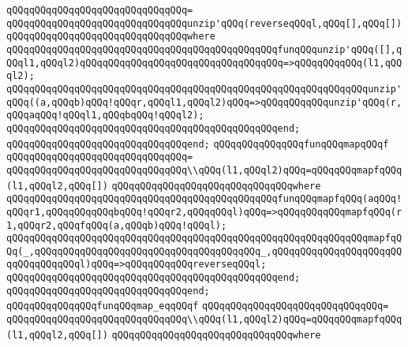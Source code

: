 \verb|qQQqqQQqqQQqqQQqqQQqqQQqqQQqqQQq=|\newline
\verb|qQQqqQQqqQQqqQQqqQQqqQQqqQQqqQQqunzip'qQQq(reverseqQQql,qQQq[],qQQq[])|\newline
\verb|qQQqqQQqqQQqqQQqqQQqqQQqqQQqqQQqwhere|\newline
\verb|qQQqqQQqqQQqqQQqqQQqqQQqqQQqqQQqqQQqqQQqqQQqqQQqfunqQQqunzip'qQQq([],qQQql1,qQQql2)qQQqqQQqqQQqqQQqqQQqqQQqqQQqqQQqqQQq=>qQQqqQQqqQQq(l1,qQQql2);|\newline
\verb|qQQqqQQqqQQqqQQqqQQqqQQqqQQqqQQqqQQqqQQqqQQqqQQqqQQqqQQqqQQqqQQqunzip'qQQq((a,qQQqb)qQQq!qQQqr,qQQql1,qQQql2)qQQq=>qQQqqQQqqQQqunzip'qQQq(r,qQQqaqQQq!qQQql1,qQQqbqQQq!qQQql2);|\newline
\verb|qQQqqQQqqQQqqQQqqQQqqQQqqQQqqQQqqQQqqQQqqQQqqQQqend;|\newline
\verb|qQQqqQQqqQQqqQQqqQQqqQQqqQQqqQQqend;|\newline
\newline
\verb|qQQqqQQqqQQqqQQqfunqQQqmapqQQqf|\newline
\verb|qQQqqQQqqQQqqQQqqQQqqQQqqQQqqQQq=|\newline
\verb|qQQqqQQqqQQqqQQqqQQqqQQqqQQqqQQq\\qQQq(l1,qQQql2)qQQq=qQQqqQQqmapfqQQq(l1,qQQql2,qQQq[])|\newline
\verb|qQQqqQQqqQQqqQQqqQQqqQQqqQQqqQQqwhere|\newline
\verb|qQQqqQQqqQQqqQQqqQQqqQQqqQQqqQQqqQQqqQQqqQQqqQQqfunqQQqmapfqQQq(aqQQq!qQQqr1,qQQqqQQqqQQqbqQQq!qQQqr2,qQQqqQQql)qQQq=>qQQqqQQqqQQqmapfqQQq(r1,qQQqr2,qQQqfqQQq(a,qQQqb)qQQq!qQQql);|\newline
\verb|qQQqqQQqqQQqqQQqqQQqqQQqqQQqqQQqqQQqqQQqqQQqqQQqqQQqqQQqqQQqqQQqmapfqQQq(_,qQQqqQQqqQQqqQQqqQQqqQQqqQQqqQQqqQQqqQQq_,qQQqqQQqqQQqqQQqqQQqqQQqqQQqqQQqqQQql)qQQq=>qQQqqQQqqQQqreverseqQQql;|\newline
\verb|qQQqqQQqqQQqqQQqqQQqqQQqqQQqqQQqqQQqqQQqqQQqqQQqend;|\newline
\verb|qQQqqQQqqQQqqQQqqQQqqQQqqQQqqQQqend;|\newline
\newline
\verb|qQQqqQQqqQQqqQQqfunqQQqmap_eqqQQqf|\newline
\verb|qQQqqQQqqQQqqQQqqQQqqQQqqQQqqQQq=|\newline
\verb|qQQqqQQqqQQqqQQqqQQqqQQqqQQqqQQq\\qQQq(l1,qQQql2)qQQq=qQQqqQQqmapfqQQq(l1,qQQql2,qQQq[])|\newline
\verb|qQQqqQQqqQQqqQQqqQQqqQQqqQQqqQQqwhere|\newline
